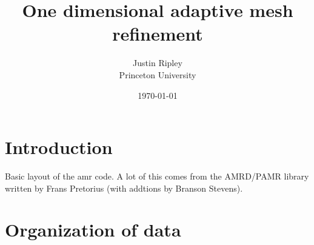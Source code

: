 \documentclass[10pt,letter]{article}
\begin{document}
\title{One dimensional adaptive mesh refinement}    
\author{Justin Ripley
	\\Princeton University}
\date{\today}
 
\maketitle 
     
\section{Introduction}
       Basic layout of the amr code. A lot of this comes from the AMRD/PAMR
library written by Frans Pretorius (with addtions by Branson Stevens).  

\section{Organization of data}
\end{document}

